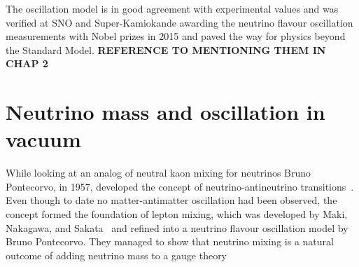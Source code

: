 The oscillation model is in good agreement with experimental values and was verified at SNO and Super-Kamiokande awarding the neutrino flavour oscillation measurements with Nobel prizes in 2015 and paved the way for physics beyond the Standard Model. \textbf{REFERENCE TO MENTIONING THEM IN CHAP 2}

\pagebreak
\section{Neutrino mass and oscillation in vacuum}\label{subsection:Neutrinomassandoscillation}
While looking at an analog of neutral kaon mixing for neutrinos Bruno Pontecorvo, in 1957, developed the concept of neutrino-antineutrino transitions~\cite{11Pontecorvo}. Even though to date no matter-antimatter oscillation had been observed, the concept formed the foundation of lepton mixing, which was developed by Maki, Nakagawa, and Sakata~\cite{12Maki} and refined into a neutrino flavour oscillation model by Bruno Pontecorvo. They managed to show that neutrino mixing is a natural outcome of adding neutrino mass to a gauge theory~\cite{11Pontecorvo}

